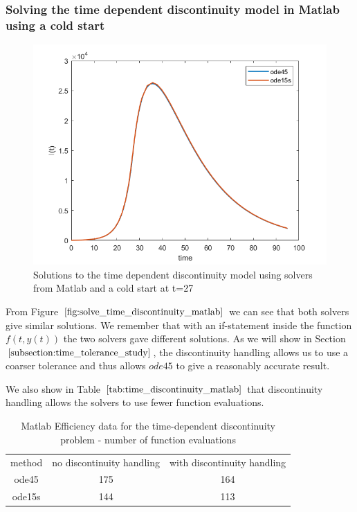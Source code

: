 \subsubsection{Solving the time dependent discontinuity model in Matlab using a cold start}
\begin{figure}[H]
\centering
\includegraphics[width=0.7\linewidth]{./figures/solve_time_discontinuity_matlab}
\caption{Solutions to the time dependent discontinuity model using solvers from Matlab and a cold start at t=27}
\label{fig:solve_time_discontinuity_matlab}
\end{figure}

From Figure $\ref{fig:solve_time_discontinuity_matlab}$ we can see that both solvers give similar solutions. We remember that with an if-statement inside the function $f(t, y(t))$ the two solvers gave different solutions. As we will show in Section $\ref{subsection:time_tolerance_study}$, the discontinuity handling allows us to use a coarser tolerance and thus allows $ode45$ to give a reasonably accurate result.

We also show in Table $\ref{tab:time_discontinuity_matlab}$ that discontinuity handling allows the solvers to use fewer function evaluations.

\begin{table}[H]
\caption {Matlab Efficiency data for the time-dependent discontinuity problem - number of function evaluations} 
\label{tab:time_discontinuity_matlab} 
\begin{center}
\begin{tabular}{ c c c }
method & no discontinuity handling & with discontinuity handling \\ 
ode45 & 175 & 164 \\
ode15s & 144 & 113 \\
\end{tabular}
\end{center}
\end{table}

